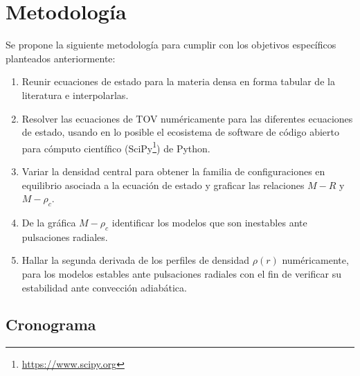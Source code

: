 \chapter{Metodología}
\setcounter{footnote}{0}
Se propone la siguiente metodología para cumplir con los objetivos específicos planteados anteriormente:

\begin{enumerate}
    \item Reunir ecuaciones de estado para la materia densa en forma tabular de la literatura e interpolarlas.
    \item Resolver las ecuaciones de TOV numéricamente para las diferentes ecuaciones de estado, usando en lo posible el ecosistema de software de código abierto para cómputo científico (SciPy\footnote{\url{https://www.scipy.org}}) de Python.
    \item Variar la densidad central para obtener la familia de configuraciones en equilibrio asociada a la ecuación de estado y graficar las relaciones $M-R$ y $M-\rho_c$.
    \item De la gráfica $M-\rho_c$ identificar los modelos que son inestables ante pulsaciones radiales.
    \item Hallar la segunda derivada de los perfiles de densidad $\rho(r)$ numéricamente, para los modelos estables ante pulsaciones radiales con el fin de verificar su estabilidad ante convección adiabática. 
\end{enumerate}
\section{Cronograma}
\centering
\noindent{}

